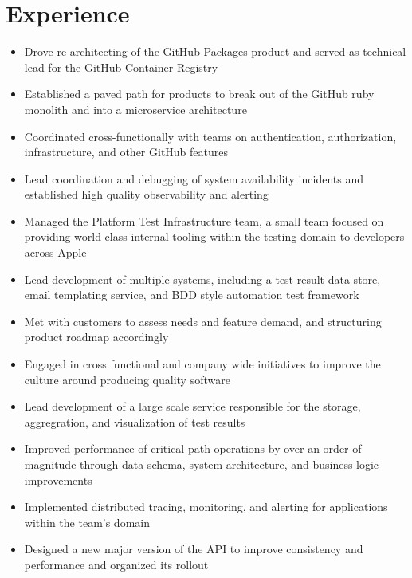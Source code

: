 \documentclass[11pt,letterpaper,sans]{moderncv}        %
\begin{document}
\makecvtitle

\vspace{-10mm}

\section{Experience}

\begin{itemize}
\item Drove re-architecting of the GitHub Packages product and served as technical lead for the GitHub Container Registry
\item Established a paved path for products to break out of the GitHub ruby monolith and into a microservice architecture
\item Coordinated cross-functionally with teams on authentication, authorization, infrastructure, and other GitHub features
\item Lead coordination and debugging of system availability incidents and established high quality observability and alerting
\end{itemize}

\begin{itemize}
\item Managed the Platform Test Infrastructure team, a small team focused on providing world class internal tooling within the testing domain to developers across Apple
\item Lead development of multiple systems, including a test result data store, email templating service, and BDD style automation test framework
\item Met with customers to assess needs and feature demand, and structuring product roadmap accordingly
\item Engaged in cross functional and company wide initiatives to improve the culture around producing quality software
\end{itemize}

\begin{itemize}
\item Lead development of a large scale service responsible for the storage, aggregration, and visualization of test results
\item Improved performance of critical path operations by over an order of magnitude through data schema, system architecture, and business logic improvements
\item Implemented distributed tracing, monitoring, and alerting for applications within the team's domain
\item Designed a new major version of the API to improve consistency and performance and organized its rollout
\end{itemize}
\end{document}
